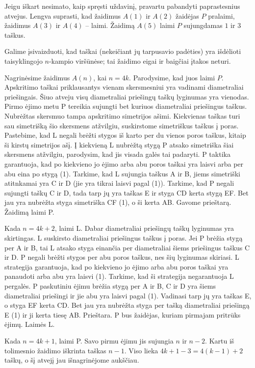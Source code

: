 Jeigu iškart nesimato, kaip spręsti uždavinį, pravartu pabandyti
paprastesnius atvejus. Lengva suprasti, kad žaidimus $A(1)$ ir $A(2)$
žaidėjas $P$ pralaimi, žaidimus $A(3)$ ir $A(4)$ – laimi. Žaidimą $A(5)$
laimi $P$ sujungdamas $1$ ir $3$ taškus. 

Galime įsivaizduoti, kad taškai (nekeičiant jų tarpusavio padėties) yra
išdėlioti taisyklingojo $n$-kampio viršūnėse; tai žaidimo eigai ir baigčiai
įtakos neturi.

Nagrinėsime žaidimus $A(n)$, kai  $n=4k$. Parodysime, kad juos laimi $P$.
Apskritimo taškai priklausantys vienam skersmesniui yra vadinami
diametraliai priešingais. Šiuo atveju visų diametraliai priešingų taškų
lyginumas yra vienodas. Pirmo ėjimo metu P tereikia sujungti bet kuriuos
diametraliai priešingus taškus. Nubrėžtas skersmuo tampa apskritimo
simetrijos ašimi. Kiekvienas taškas turi sau simetrišką šio skersmens
atžvilgiu, suskirstome simetriškus taškus į poras. Pastebime, kad L negali
brėžti stygos iš karto per du vienos poros taškus, kitaip ši kirstų
simetrijos ašį. Į kiekvieną L nubrėžtą stygą P atsako simetriška šiai
skersmens atžvilgiu, parodysim, kad jis visada galės tai padaryti. P
taktika garantuoja, kad po kiekvieno jo ėjimo arba abu poros taškai yra
laisvi arba per abu eina po stygą (1). Tarkime, kad L sujungia taškus A ir B, jiems
simetriški atitnkamai yra C ir D (jie yra tikrai laisvi pagal (1)).
Tarkime, kad P negali sujungti taškų C ir D, tada tarp jų yra taškas E ir
styga CD kerta stygą EF. Bet jau yra nubrėžta styga simetriška CF (1), o ši
kerta AB. Gavome prieštarą. Žaidimą laimi P. 

Kada $n=4k+2$, laimi L. Dabar diametraliai priešingų taškų lyginumas yra
skirtingas. L suskirsto diametraliai priešingus taškus į poras. Jei P
brėžia stygą per A ir B, tai L atsako styga einančia per diametraliai šiems
priešingus taškus C ir D. P negali brėžti stygos per abu poros taškus, nes šių
lyginumas skiriasi. L strategija garantuoja, kad po kiekvieno jo ėjimo arba
abu poros taškai yra panaudoti arba abu yra laisvi (1). Tarkime, kad ši
strategija negarantuoja L pergalės. P paskutiniu ėjimu brėžia stygą per A ir B, C ir D yra šiems diametraliai priešingi ir jie abu
yra laisvi pagal (1). Vadinasi tarp jų yra taškas E, o styga EF kerta CD.
Bet jau yra nubrėžta styga per tašką diametraliai priešingą E (1) ir ji
kerta tiesę AB. Prieštara. P bus žaidėjas, kuriam pirmajam pritrūks ėjimų.
Laimės L.

Kada $n=4k+1$, laimi P. Savo pirmu ėjimu jis sujungia $n$ ir $n-2$. Kartu
iš tolimesnio žaidimo iškrinta taškas $n-1$. Viso lieka $4k+1-3=4(k-1)+2$
taškų, o šį atvejį jau išnagrinėjome aukščiau. 


